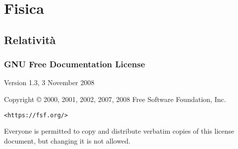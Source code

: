 \documentclass[]{report}
\theoremstyle{definition}
\theoremstyle{remark}
\theoremstyle{plain}
\numberwithin{equation}{chapter}
\begin{document}
\part{Fisica}



\chapter{Relativit\`{a}}



\pagebreak



\scriptsize

\section*{\centering GNU Free Documentation License}

\begin{center}
	Version 1.3, 3 November 2008

	Copyright \copyright{} 2000, 2001, 2002, 2007, 2008  Free Software Foundation, Inc.

	\bigskip

	\texttt{<https://fsf.org/>}

	\bigskip

	Everyone is permitted to copy and distribute verbatim copies
	of this license document, but changing it is not allowed.
\end{center}
\end{document}

